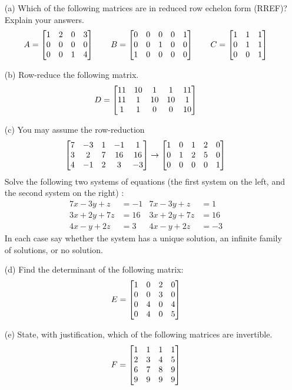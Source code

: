 \documentclass[a4paper]{article}
\begin{document}
\begin{problem}[2011-12]
 \begin{itemize}
  \item[(a)] Which of the following matrices are in reduced row echelon form (RREF)? 
   Explain your answers. 
   \[ 
    A = \left[\begin{matrix} 1&2&0&3 \\ 0&0&0&0 \\ 0&0&1&4 \end{matrix}\right] \qquad
    B = \left[\begin{matrix} 0&0&0&0&1 \\ 0&0&1&0&0 \\ 1&0&0&0&0 \end{matrix}\right] \qquad
    C = \left[\begin{matrix} 1&1&1 \\ 0&1&1 \\ 0&0&1 \end{matrix}\right]   
   \]
  \item[(b)] Row-reduce the following matrix. 
   \[ D = \left[\begin{matrix} 11 & 10 &  1 &  1 & 11 \\ 
               11 &  1 & 10 & 10 &  1 \\
                1 &  1 &  0 &  0 & 10 \end{matrix}\right] 
   \]
  \item[(c)]
   You may assume the row-reduction 
   \[ 
    \left[\begin{matrix}
     7 & -3 & 1 & -1 & 1 \\ 
     3 &  2 & 7 & 16 & 16 \\
     4 & -1 & 2 &  3 & -3
    \end{matrix}\right]
    \to
    \left[\begin{matrix}
     1 & 0 & 1 & 2 & 0 \\
     0 & 1 & 2 & 5 & 0 \\
     0 & 0 & 0 & 0 & 1
    \end{matrix}\right] 
   \]
   Solve the following two systems of equations (the first
   system on the left, and the second system on the right) : 
   \begin{align*}
    7x-3y+z  &= -1 &
    7x-3y+z  &=  1 \\
    3x+2y+7z &= 16 &
    3x+2y+7z &= 16 \\
    4x-y+2z  &=  3 &
    4x-y+2z  &= -3 
   \end{align*}
   In each case say whether the system has a unique solution, an
   infinite family of solutions, or no solution.  
  \item[(d)] Find the determinant of the following matrix: 
   \[ E = \left[\begin{matrix} 
       1 & 0 & 2 & 0 \\
       0 & 0 & 3 & 0 \\ 
       0 & 4 & 0 & 4 \\
       0 & 4 & 0 & 5 
      \end{matrix}\right]
   \]
  \item[(e)] State, with justification, which of the following
   matrices are invertible. 
   \[ 
    F = \left[\begin{matrix} 1&1&1&1 \\ 2&3&4&5 \\ 6&7&8&9 \\ 9&9&9&9 \end{matrix}\right] 
\]
\end{itemize}
\end{problem}
\end{document}
